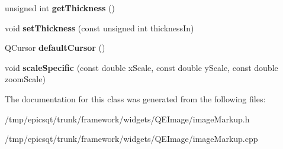 \begin{DoxyCompactItemize}
\item 
\hypertarget{classmarkupLine_ad7e1dd31f002bf61d641de9f976477dc}{
unsigned int {\bfseries getThickness} ()}
\label{classmarkupLine_ad7e1dd31f002bf61d641de9f976477dc}

\item 
\hypertarget{classmarkupLine_aa387941af23d477813642f4dbcd67351}{
void {\bfseries setThickness} (const unsigned int thicknessIn)}
\label{classmarkupLine_aa387941af23d477813642f4dbcd67351}

\item 
\hypertarget{classmarkupLine_a2ee805b61113dafe417a1be248abcccd}{
QCursor {\bfseries defaultCursor} ()}
\label{classmarkupLine_a2ee805b61113dafe417a1be248abcccd}

\item 
\hypertarget{classmarkupLine_ae46565aa45cc6141b4efe70b6b0d74a8}{
void {\bfseries scaleSpecific} (const double xScale, const double yScale, const double zoomScale)}
\label{classmarkupLine_ae46565aa45cc6141b4efe70b6b0d74a8}

\end{DoxyCompactItemize}


The documentation for this class was generated from the following files:\begin{DoxyCompactItemize}
\item 
/tmp/epicsqt/trunk/framework/widgets/QEImage/imageMarkup.h\item 
/tmp/epicsqt/trunk/framework/widgets/QEImage/imageMarkup.cpp\end{DoxyCompactItemize}
